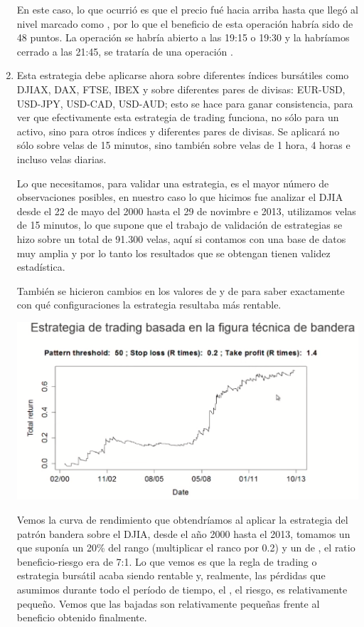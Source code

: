 \begin{enumerate}
    En este caso, lo que ocurrió es que el precio fué hacia arriba hasta que llegó al nivel marcado como , por lo que el beneficio de esta operación habría sido de 48 puntos. La operación se habría abierto a las 19:15 o 19:30 y la habríamos cerrado a las 21:45, se trataría de una operación .
    \item Esta estrategia debe aplicarse ahora sobre diferentes índices bursátiles como DJIAX, DAX, FTSE, IBEX y sobre diferentes pares de divisas: EUR-USD, USD-JPY, USD-CAD, USD-AUD; esto se hace para ganar consistencia, para ver que efectivamente esta estrategia de trading funciona, no sólo para un activo, sino para otros índices y diferentes pares de divisas. Se aplicará no sólo sobre velas de 15 minutos, sino también sobre velas de 1 hora, 4 horas e incluso velas diarias.
    
    Lo que necesitamos, para validar una estrategia, es el mayor número de observaciones posibles, en nuestro caso lo que hicimos fue analizar el DJIA desde el 22 de mayo del 2000 hasta el 29 de novimbre e 2013, utilizamos velas de 15 minutos, lo que supone que el trabajo de validación de estrategias se hizo sobre un total de 91.300 velas, aquí si contamos con una base de datos muy amplia y por lo tanto los resultados que se obtengan tienen validez estadística. 

    También se hicieron cambios en los valores de  y de  para saber exactamente con qué configuraciones la estrategia resultaba más rentable.

    \begin{center}
        \includegraphics[scale=.65]{images/mod03-15.png}
    \end{center}
    Vemos la curva de rendimiento que obtendríamos al aplicar la estrategia del patrón bandera sobre el DJIA, desde el año 2000 hasta el 2013, tomamos un  que suponía un 20\% del rango (multiplicar el ranco por 0.2) y un  de , el ratio beneficio-riesgo era de 7:1. Lo que vemos es que la regla de trading o estrategia bursátil acaba siendo rentable y, realmente, las pérdidas que asumimos durante todo el período de tiempo, el , el riesgo, es relativamente pequeño. Vemos que las bajadas son relativamente pequeñas frente al beneficio obtenido finalmente.


\end{enumerate}
